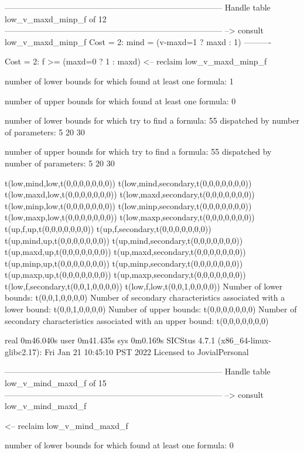 --------------------------------------------------------------------------------
Handle table low_v_maxd_minp_f of 12
--------------------------------------------------------------------------------
--> consult low_v_maxd_minp_f
Cost =  2:  mind = (v-maxd=1 ? maxd : 1)
----------

Cost =  2:  f >= (maxd=0 ? 1 : maxd)
<-- reclaim low_v_maxd_minp_f

number of lower bounds for which found at least one formula: 1

number of upper bounds for which found at least one formula: 0

number of lower bounds for which try to find a formula: 55
dispatched by number of parameters: 5  20  30

number of upper bounds for which try to find a formula: 55
dispatched by number of parameters: 5  20  30

t(low,mind,low,t(0,0,0,0,0,0,0))
t(low,mind,secondary,t(0,0,0,0,0,0,0))
t(low,maxd,low,t(0,0,0,0,0,0,0))
t(low,maxd,secondary,t(0,0,0,0,0,0,0))
t(low,minp,low,t(0,0,0,0,0,0,0))
t(low,minp,secondary,t(0,0,0,0,0,0,0))
t(low,maxp,low,t(0,0,0,0,0,0,0))
t(low,maxp,secondary,t(0,0,0,0,0,0,0))
t(up,f,up,t(0,0,0,0,0,0,0))
t(up,f,secondary,t(0,0,0,0,0,0,0))
t(up,mind,up,t(0,0,0,0,0,0,0))
t(up,mind,secondary,t(0,0,0,0,0,0,0))
t(up,maxd,up,t(0,0,0,0,0,0,0))
t(up,maxd,secondary,t(0,0,0,0,0,0,0))
t(up,minp,up,t(0,0,0,0,0,0,0))
t(up,minp,secondary,t(0,0,0,0,0,0,0))
t(up,maxp,up,t(0,0,0,0,0,0,0))
t(up,maxp,secondary,t(0,0,0,0,0,0,0))
t(low,f,secondary,t(0,0,1,0,0,0,0))
t(low,f,low,t(0,0,1,0,0,0,0))
Number of lower bounds:                                             t(0,0,1,0,0,0,0)
Number of secondary characteristics associated with a lower bound:  t(0,0,1,0,0,0,0)
Number of upper bounds:                                             t(0,0,0,0,0,0,0)
Number of secondary characteristics associated with an upper bound: t(0,0,0,0,0,0,0)

real	0m46.040s
user	0m41.435s
sys	0m0.169s
SICStus 4.7.1 (x86_64-linux-glibc2.17): Fri Jan 21 10:45:10 PST 2022
Licensed to JovialPersonal


--------------------------------------------------------------------------------
Handle table low_v_mind_maxd_f of 15
--------------------------------------------------------------------------------
--> consult low_v_mind_maxd_f

<-- reclaim low_v_mind_maxd_f

number of lower bounds for which found at least one formula: 0

